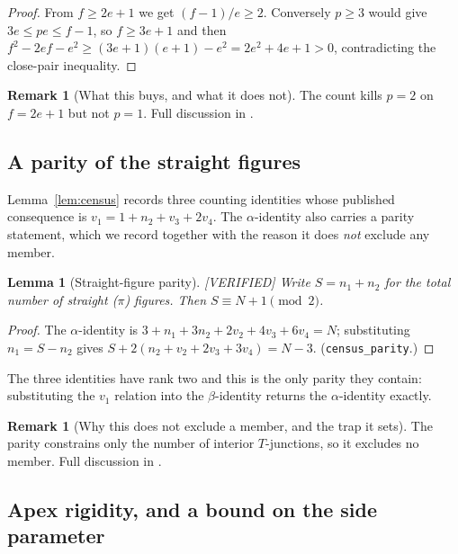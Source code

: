 \documentclass[11pt,reqno]{amsart}
\theoremstyle{plain}
\newtheorem{lemma}[theorem]{Lemma}
\theoremstyle{definition}
\newtheorem{remark}[theorem]{Remark}
\newcommand{\lab}[1]{\hfill\textnormal{\footnotesize\textsc{[#1]}}}
\begin{document}
\begin{proof}
From $f\ge2e+1$ we get $(f-1)/e\ge2$. Conversely $p\ge3$ would give $3e\le pe\le f-1$, so
$f\ge3e+1$ and then $f^2-2ef-e^2\ge(3e+1)(e+1)-e^2=2e^2+4e+1>0$, contradicting the close-pair
inequality.
\end{proof}

\begin{remark}[What this buys, and what it does not]\label{rem:ptwoscope}
The count kills $p=2$ on $f=2e+1$ but not $p=1$. Full discussion in \cite{Obstructions}.
\end{remark}

\subsection{A parity of the straight figures}\label{sub:parity}

Lemma~\ref{lem:census} records three counting identities whose published consequence is
$v_1=1+n_2+v_3+2v_4$. The $\alpha$-identity also carries a parity statement, which we record together
with the reason it does \emph{not} exclude any member.

\begin{lemma}[Straight-figure parity]\label{lem:parity}\lab{VERIFIED}
Write $S=n_1+n_2$ for the total number of straight ($\pi$) figures. Then $S\equiv N+1\pmod 2$.
\end{lemma}

\begin{proof}
The $\alpha$-identity is $3+n_1+3n_2+2v_2+4v_3+6v_4=N$; substituting $n_1=S-n_2$ gives
$S+2(n_2+v_2+2v_3+3v_4)=N-3$. \textup{(}\texttt{census\_parity}.\textup{)}
\end{proof}

The three identities have rank two and this is the only parity they contain: substituting the
$v_1$ relation into the $\beta$-identity returns the $\alpha$-identity exactly.

\begin{remark}[Why this does not exclude a member, and the trap it sets]\label{rem:parityscope}
The parity constrains only the number of interior $T$-junctions, so it excludes no member. Full discussion in \cite{Obstructions}.
\end{remark}


\subsection{Apex rigidity, and a bound on the side parameter}\label{sub:apex}
\end{document}
